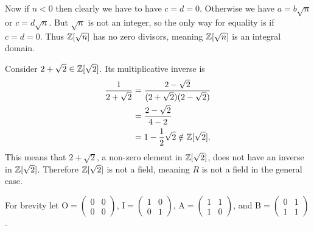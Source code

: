\begin{questions}
\begin{partquestions}{\alph*}
        Now if $n < 0$ then clearly we have to have $c = d = 0$. Otherwise we have $a = b\sqrt n$ or $c = d\sqrt n$. But $\sqrt n$ is not an integer, so the only way for equality is if $c = d = 0$. Thus $\mathbb{Z}[\sqrt n]$ has no zero divisors, meaning $\mathbb{Z}[\sqrt n]$ is an integral domain.

        \item Consider $2 + \sqrt 2 \in \mathbb{Z}[\sqrt 2]$. Its multiplicative inverse is
        \begin{align*}
            \frac{1}{2+\sqrt2} &= \frac{2-\sqrt2}{(2+\sqrt2)(2-\sqrt2)}\\
            &= \frac{2-\sqrt2}{4-2}\\
            &= 1 - \frac12\sqrt2 \notin \mathbb{Z}[\sqrt2].
        \end{align*}
        This means that $2+\sqrt2$, a non-zero element in $\mathbb{Z}[\sqrt2]$, does not have an inverse in $\mathbb{Z}[\sqrt2]$. Therefore $\mathbb{Z}[\sqrt2]$ is not a field, meaning $R$ is not a field in the general case.
    \end{partquestions}

    \newpage

    \item For brevity let O$ = \begin{pmatrix}0&0\\0&0\end{pmatrix}$, I$ = \begin{pmatrix}1&0\\0&1\end{pmatrix}$, A$ = \begin{pmatrix}1&1\\1&0\end{pmatrix}$, and B$ = \begin{pmatrix}0&1\\1&1\end{pmatrix}$.
    

\end{questions}
